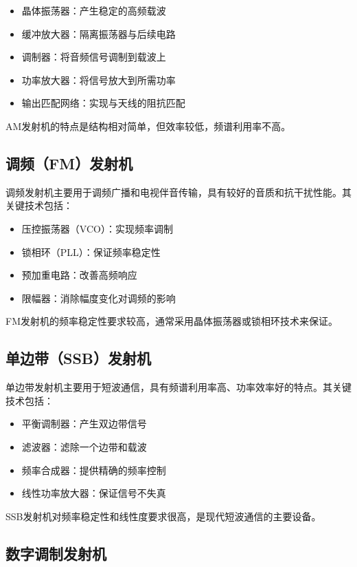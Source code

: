 \documentclass[12pt,UTF8]{ctexbook}
\begin{document}
\begin{itemize}[leftmargin=3.5em]
    \item 晶体振荡器：产生稳定的高频载波
    \item 缓冲放大器：隔离振荡器与后续电路
    \item 调制器：将音频信号调制到载波上
    \item 功率放大器：将信号放大到所需功率
    \item 输出匹配网络：实现与天线的阻抗匹配
\end{itemize}

AM发射机的特点是结构相对简单，但效率较低，频谱利用率不高。

\subsection{调频（FM）发射机}

调频发射机主要用于调频广播和电视伴音传输，具有较好的音质和抗干扰性能。其关键技术包括：

\begin{itemize}[leftmargin=3.5em]
    \item 压控振荡器（VCO）：实现频率调制
    \item 锁相环（PLL）：保证频率稳定性
    \item 预加重电路：改善高频响应
    \item 限幅器：消除幅度变化对调频的影响
\end{itemize}

FM发射机的频率稳定性要求较高，通常采用晶体振荡器或锁相环技术来保证。

\subsection{单边带（SSB）发射机}

单边带发射机主要用于短波通信，具有频谱利用率高、功率效率好的特点。其关键技术包括：

\begin{itemize}[leftmargin=3.5em]
    \item 平衡调制器：产生双边带信号
    \item 滤波器：滤除一个边带和载波
    \item 频率合成器：提供精确的频率控制
    \item 线性功率放大器：保证信号不失真
\end{itemize}

SSB发射机对频率稳定性和线性度要求很高，是现代短波通信的主要设备。

\subsection{数字调制发射机}
\end{document}
